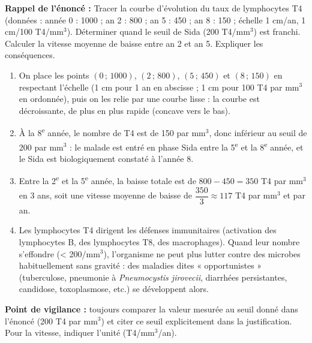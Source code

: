 \documentclass[11pt]{article}
\newcommand{\cle}[1]{{\popxbold\color{popdark}#1}}
\begin{document}
\begin{corrige}
\textbf{Rappel de l'énoncé :} Tracer la courbe d'évolution du taux de lymphocytes T4 (données : année 0 : 1000 ; an 2 : 800 ; an 5 : 450 ; an 8 : 150 ; échelle 1 cm/an, 1 cm/100 T4/mm$^3$). Déterminer quand le seuil de Sida (200 T4/mm$^3$) est franchi. Calculer la vitesse moyenne de baisse entre an 2 et an 5. Expliquer les conséquences.
\tcblower
\begin{enumerate}
\item On place les points $(0\,;\,1000)$, $(2\,;\,800)$, $(5\,;\,450)$ et $(8\,;\,150)$ en respectant l'échelle (1 cm pour 1 an en abscisse ; 1 cm pour 100 T4 par mm$^3$ en ordonnée), puis on les relie par une courbe lisse : la courbe est décroissante, de plus en plus rapide (concave vers le bas).
\item À la 8\textsuperscript{e} année, le nombre de T4 est de 150 par mm$^3$, donc inférieur au seuil de 200 par mm$^3$ : le malade est entré en phase Sida entre la 5\textsuperscript{e} et la 8\textsuperscript{e} année, et le Sida est biologiquement constaté à l'année 8.
\item Entre la 2\textsuperscript{e} et la 5\textsuperscript{e} année, la baisse totale est de $800 - 450 = 350$ T4 par mm$^3$ en 3 ans, soit une vitesse moyenne de baisse de $\dfrac{350}{3} \approx 117$ T4 par mm$^3$ et par an.
\item Les lymphocytes T4 dirigent les défenses immunitaires (activation des lymphocytes B, des lymphocytes T8, des macrophages). Quand leur nombre s'effondre (< 200/mm$^3$), l'organisme ne peut plus lutter contre des microbes habituellement sans gravité : des maladies dites « \cle{opportunistes} » (tuberculose, pneumonie à \emph{Pneumocystis jirovecii}, diarrhées persistantes, candidose, toxoplasmose, etc.) se développent alors.
\end{enumerate}
\textbf{Point de vigilance :} toujours comparer la valeur mesurée au seuil donné dans l'énoncé (200 T4 par mm$^3$) et citer ce seuil explicitement dans la justification. Pour la vitesse, indiquer l'unité (T4/mm$^3$/an).
\end{corrige}
\end{document}
